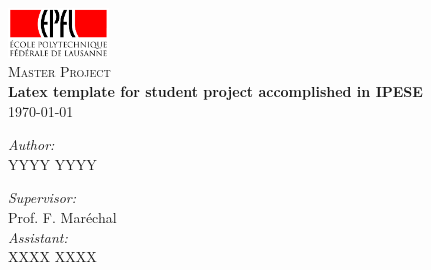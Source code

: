 \documentclass[a4paper,12pt]{article}
\begin{document}
\begin{titlepage}
 \begin{center}
  \includegraphics[width=0.2\textwidth]{logo_epfl.png}\\[1cm]
 
\Large \textsc{Master Project}\\[2cm] %

{ \huge \bfseries Latex template for student project accomplished in IPESE}\\[2cm]

\today\\[2cm]
\begin{minipage}{0.4\textwidth}
\begin{flushleft} \large
\emph{Author:}\\
YYYY YYYY
\end{flushleft}
\end{minipage}
\begin{minipage}{0.4\textwidth}
\begin{flushright} \large
\emph{Supervisor:} \\
Prof. F. Mar\'echal 
\\[0.5cm]
\emph{Assistant:} \\
XXXX XXXX
\end{flushright}
\end{minipage}
\vfill


\end{center}
\end{titlepage}
\end{document}
